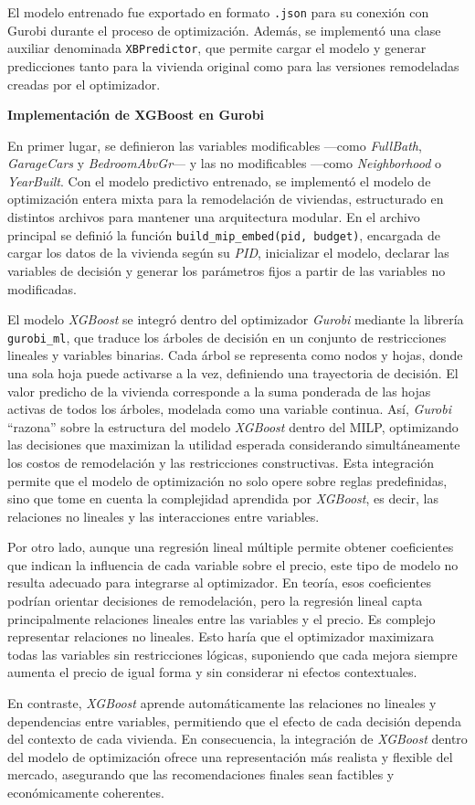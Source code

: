 El modelo entrenado fue exportado en formato \texttt{.json} para su conexi\'on con Gurobi durante el proceso de optimizaci\'on. Adem\'as, se implement\'o una clase auxiliar denominada \texttt{XBPredictor}, que permite cargar el modelo y generar predicciones tanto para la vivienda original como para las versiones remodeladas creadas por el optimizador.

\noindent\textbf{Implementación de XGBoost en Gurobi}

En primer lugar, se definieron las variables modificables —como \textit{FullBath}, \textit{GarageCars} y \textit{BedroomAbvGr}— y las no modificables —como \textit{Neighborhood} o \textit{YearBuilt}. Con el modelo predictivo entrenado, se implementó el modelo de optimización entera mixta para la remodelación de viviendas, estructurado en distintos archivos para mantener una arquitectura modular. En el archivo principal se definió la función \texttt{build\_mip\_embed(pid, budget)}, encargada de cargar los datos de la vivienda según su \textit{PID}, inicializar el modelo, declarar las variables de decisión y generar los parámetros fijos a partir de las variables no modificadas.  

El modelo \textit{XGBoost} se integró dentro del optimizador \textit{Gurobi} mediante la librería \texttt{gurobi\_ml}, que traduce los árboles de decisión en un conjunto de restricciones lineales y variables binarias. Cada árbol se representa como nodos y hojas, donde una sola hoja puede activarse a la vez, definiendo una trayectoria de decisión. El valor predicho de la vivienda corresponde a la suma ponderada de las hojas activas de todos los árboles, modelada como una variable continua. Así, \textit{Gurobi} “razona” sobre la estructura del modelo \textit{XGBoost} dentro del MILP, optimizando las decisiones que maximizan la utilidad esperada considerando simultáneamente los costos de remodelación y las restricciones constructivas.  
Esta integración permite que el modelo de optimización no solo opere sobre reglas predefinidas, sino que tome en cuenta la complejidad aprendida por \textit{XGBoost}, es decir, las relaciones no lineales y las interacciones entre variables.

Por otro lado, aunque una regresión lineal múltiple permite obtener coeficientes que indican la influencia de cada variable sobre el precio, este tipo de modelo no resulta adecuado para integrarse al optimizador. En teoría, esos coeficientes podrían orientar decisiones de remodelación, pero la regresión lineal capta principalmente relaciones lineales entre las variables y el precio. Es complejo representar relaciones no lineales. Esto haría que el optimizador maximizara todas las variables sin restricciones lógicas, suponiendo que cada mejora siempre aumenta el precio de igual forma y sin considerar ni efectos contextuales.  

En contraste, \textit{XGBoost} aprende automáticamente las relaciones no lineales y dependencias entre variables, permitiendo que el efecto de cada decisión dependa del contexto de cada vivienda. En consecuencia, la integración de \textit{XGBoost} dentro del modelo de optimización ofrece una representación más realista y flexible del mercado, asegurando que las recomendaciones finales sean factibles y económicamente coherentes.  
